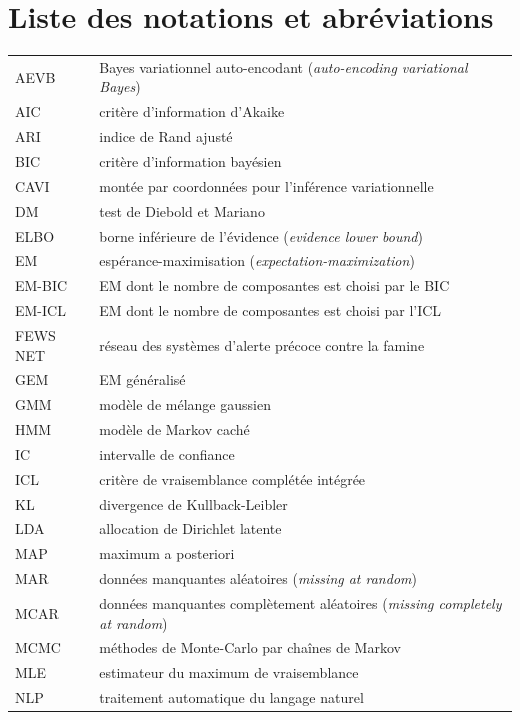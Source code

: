 \chapter*{Liste des notations et abréviations}
{\renewcommand{\arraystretch}{0.92}%
\begin{tabular}{@{}ll@{}}
AEVB & Bayes variationnel auto-encodant (\emph{auto-encoding variational Bayes}) \\
AIC & critère d'information d'Akaike \\
ARI & indice de Rand ajusté \\
BIC & critère d'information bayésien \\
CAVI & montée par coordonnées pour l'inférence variationnelle \\
DM & test de Diebold et Mariano \\
ELBO & borne inférieure de l'évidence (\emph{evidence lower bound}) \\
EM & espérance-maximisation (\emph{expectation-maximization}) \\
EM-BIC & EM dont le nombre de composantes est choisi par le BIC \\
EM-ICL & EM dont le nombre de composantes est choisi par l'ICL \\
FEWS NET & réseau des systèmes d'alerte précoce contre la famine \\
GEM & EM généralisé \\
GMM & modèle de mélange gaussien \\
HMM & modèle de Markov caché \\
IC & intervalle de confiance \\
ICL & critère de vraisemblance complétée intégrée \\
KL & divergence de Kullback-Leibler \\
LDA & allocation de Dirichlet latente \\
MAP & maximum a posteriori \\
MAR & données manquantes aléatoires (\emph{missing at random}) \\
MCAR & données manquantes complètement aléatoires (\emph{missing completely at random}) \\
MCMC & méthodes de Monte-Carlo par chaînes de Markov \\
MLE & estimateur du maximum de vraisemblance \\
NLP & traitement automatique du langage naturel \\

\end{tabular}}
